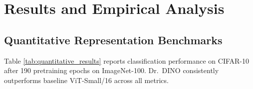 \documentclass[11pt,a4paper]{article}
\begin{document}
\section{Results and Empirical Analysis}
\label{sec:results}

\subsection{Quantitative Representation Benchmarks}

Table \ref{tab:quantitative_results} reports classification performance on CIFAR-10 after 190 pretraining epochs on ImageNet-100. Dr.\ DINO consistently outperforms baseline ViT-Small/16 across all metrics.
\end{document}
